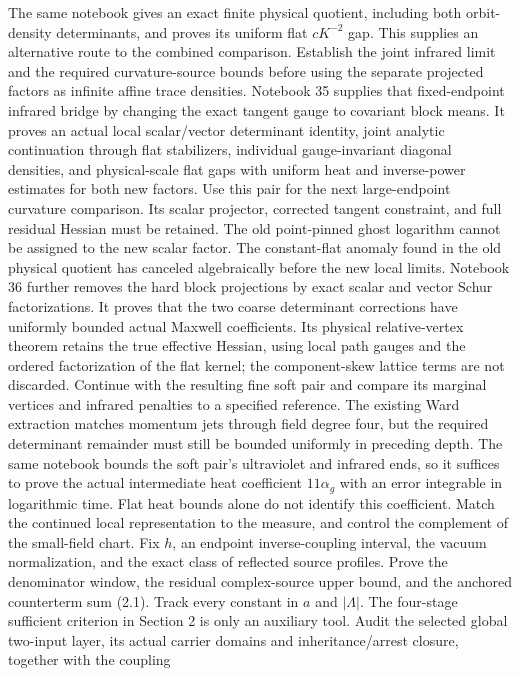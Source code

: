 \documentclass[11pt]{article}
\theoremstyle{remark}
\begin{document}
\begin{enumerate}
The same notebook gives an exact finite physical quotient,
including both orbit-density determinants, and proves its
uniform flat \(cK^{-2}\) gap. This supplies an alternative
route to the combined comparison. Establish the joint
infrared limit and the required curvature-source bounds
before using the separate projected factors as infinite
affine trace densities.
Notebook 35 supplies that fixed-endpoint infrared bridge by
changing the exact tangent gauge to covariant block means.
It proves an actual local scalar/vector determinant identity,
joint analytic continuation through flat stabilizers, individual
gauge-invariant diagonal densities, and physical-scale flat
gaps with uniform heat and inverse-power estimates for both
new factors. Use this pair for the next large-endpoint curvature
comparison. Its scalar projector, corrected tangent constraint,
and full residual Hessian must be retained. The old point-pinned
ghost logarithm cannot be assigned to the new scalar factor.
The constant-flat anomaly found in the old physical quotient
has canceled algebraically before the new local limits.
Notebook 36 further removes the hard block projections by exact
scalar and vector Schur factorizations. It proves that the two
coarse determinant corrections have uniformly bounded actual
Maxwell coefficients. Its physical relative-vertex theorem
retains the true effective Hessian, using local path gauges
and the ordered factorization of the flat kernel; the
component-skew lattice terms are not discarded. Continue with
the resulting fine soft pair and compare its marginal
vertices and infrared penalties to a specified reference.
The existing Ward extraction matches momentum jets through
field degree four, but the required determinant remainder
must still be bounded uniformly in preceding depth.
The same notebook bounds the soft pair's ultraviolet and
infrared ends, so it suffices to prove the actual intermediate
heat coefficient \(11\alpha_g\) with an error integrable in
logarithmic time. Flat heat bounds alone do not identify this
coefficient.
Match the continued local representation
to the measure, and control the complement of the small-field chart.
Fix $h$, an endpoint inverse-coupling interval, the vacuum normalization,
and the exact class of reflected source profiles. Prove the denominator
window, the residual complex-source upper bound, and the anchored
counterterm sum (2.1). Track every constant in $a$ and $|\Lambda|$.
The four-stage sufficient criterion in Section 2 is only an auxiliary
tool. Audit the selected global two-input layer, its actual carrier
domains and inheritance/arrest closure, together with the coupling

\end{enumerate}
\end{document}
